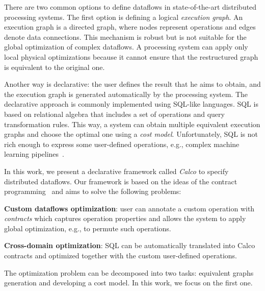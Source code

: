 There are two common options to define dataflows in state-of-the-art distributed processing systems.
The first option is defining a logical {\em execution graph}.
An execution graph is a directed graph, where nodes represent operations and edges denote data connections.
This mechanism is robust but is not suitable for the global optimization of complex dataflows.
A processing system can apply only local physical optimizations because it cannot ensure that the restructured graph is equivalent to the original one.

Another way is declarative: the user defines the result that he aims to obtain, and the execution graph is generated automatically by the processing system.
The declarative approach is commonly implemented using SQL-like languages.
SQL is based on relational algebra that includes a set of operations and query transformation rules.
This way, a system can obtain multiple equivalent execution graphs and choose the optimal one using a {\em cost model}.
Unfortunately, SQL is not rich enough to express some user-defined operations, e.g., complex machine learning pipelines~\cite{schule2019mlearn}.

In this work, we present a declarative framework called {\em Calco} to specify distributed dataflows.
Our framework is based on the ideas of the contract programming~\cite{meyer2002design} and aims to solve the following problems:

{\bf Custom dataflows optimization}: user can annotate a custom operation with {\em contracts} which captures operation properties and allows the system to apply global optimization, e.g., to permute such operations.

{\bf Cross-domain optimization}: SQL can be automatically translated into Calco contracts and optimized together with the custom user-defined operations.

The optimization problem can be decomposed into two tasks: equivalent graphs generation and developing a cost model.
In this work, we focus on the first one.
